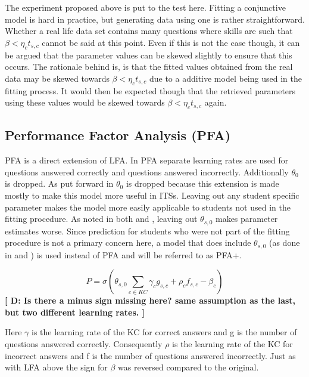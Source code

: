\documentclass{scrartcl}
\providecommand{\comm}[1]{{\bf[ #1 ]}}
\providecommand{\commd}[1]{\comm{D: {#1}}}
\begin{document}
The experiment proposed above is put to the test here. Fitting a conjunctive model is hard in practice, but generating data using one is rather straightforward. Whether a real life data set contains many questions where skills are such that $\beta < \eta_{c} t_{s,c}$ cannot be said at this point. Even if this is not the case though, it can be argued that the parameter values can be skewed slightly to ensure that this occurs. The rationale behind is, is that the fitted values obtained from the real data may be skewed towards $\beta < \eta_{c} t_{s,c}$ due to a additive model being used in the fitting process. It would then be expected though that the retrieved parameters using these values would be skewed towards $\beta < \eta_{c} t_{s,c}$ again.

\subsection{Performance Factor Analysis (PFA)}
PFA is a direct extension of LFA. In PFA separate learning rates are used for questions answered correctly and questions answered incorrectly. Additionally $\theta_{0}$ is dropped. As put forward in \cite{pfa} $\theta_{0}$ is dropped because this extension is made mostly to make this model more useful in ITSs. Leaving out any student specific parameter makes the model more easily applicable to students not used in the fitting procedure. As noted in both \cite{ktpfa} and \cite{blackart}, leaving out $\theta_{s,0}$ makes parameter estimates worse. Since prediction for students who were not part of the fitting procedure is not a primary concern here, a model that does include $\theta_{s,0}$ (as done in \cite{ktpfa} and \cite{blackart}) is used instead of PFA and will be referred to as PFA+.

\begin{equation}
P = \sigma(\theta_{s,0} \sum_{c \in KC}  \gamma_{c} g_{s,c} + \rho_{c} f_{s,c} - \beta_{c})
\end{equation}
\commd{Is there a minus sign missing here? same assumption as the last, but two different learning rates. }

Here $\gamma$ is the learning rate of the KC for correct answers and g is the number of questions answered correctly. Consequently $\rho$ is the learning rate of the KC for incorrect answers and f is the number of questions answered incorrectly. Just as with LFA above the sign for $\beta$ was reversed compared to the original.
\end{document}
